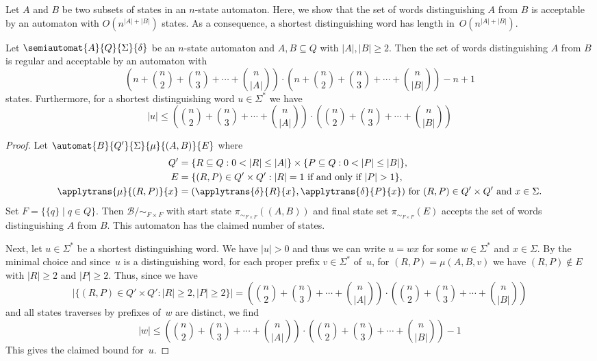
Let $A$ and $B$ be two subsets of states in an $n$-state automaton.
Here, we show that the set of words distinguishing $A$ from $B$
is acceptable by an automaton with $O(n^{|A|+|B|})$ states.
As a consequence, a shortest distinguishing word has length in~$O(n^{|A|+|B|})$.

\begin{theorem}
	\label{sync_max:thm:distinguishing_word_bound}
	Let $\semiautomat{A}{Q}{\Sigma}{\delta}$ 
	be an $n$-state automaton and $A, B \subseteq Q$
	with $|A|, |B| \ge 2$.	
	Then the set of words distinguishing $A$ from $B$ is regular
	and acceptable by an automaton with 
	\[
	\left( n + \binom{n}{2} + \binom{n}{3} + \cdots + \binom{n}{|A|} \right) \cdot
	\left( n + \binom{n}{2} + \binom{n}{3} + \cdots + \binom{n}{|B|} \right) - n + 1
	\]
	states.	Furthermore, for a shortest distinguishing word $u \in \Sigma^*$ we have
	\[
	|u| \le \left( \binom{n}{2} + \binom{n}{3} + \cdots + \binom{n}{|A|} \right) \cdot
	\left( \binom{n}{2} + \binom{n}{3} + \cdots + \binom{n}{|B|} \right)
	\]
\end{theorem}
\begin{proof}
	Let  $\automat{B}{Q'}{\Sigma}{\mu}{(A,B)}{E}$ where
	\begin{align*}
		Q' & = \{ R \subseteq Q : 0 < |R| \le |A| \} \times \{ P \subseteq Q : 0 < |P| \le |B| \}, \\
		E & = \{ (R, P) \in Q' \times Q' : |R| = 1 \text{ if and only if } |P| > 1 \}, \\
		\applytrans{\mu}{(R, P)}{x} & = (\applytrans{\delta}{R}{x}, \applytrans{\delta}{P}{x}) \text{ for } (R, P) \in Q' \times Q' \text{ and } x \in \Sigma.
	\end{align*}
    Set $F =  \{ \{q\} \mid q \in Q \}$.
    Then $\mathcal B / {\sim_{F \times F}}$ with start state $\pi_{\sim_{F \times F}}((A,B))$
    and final state set $\pi_{\sim_{F\times F}}(E)$
    accepts the set of words distinguishing $A$ from $B$.
    This automaton has the claimed number of states.
        
    Next, let $u \in \Sigma^*$ be a shortest distinguishing word.
    We have $|u| > 0$ and thus we can write $u = wx$ for some $w \in \Sigma^*$ and $x \in \Sigma$.
    By the minimal choice and since~$u$ is a distinguishing word, 
    for each proper prefix $v \in \Sigma^*$
    of~$u$, for $(R, P) = \mu(A, B, v)$
    we have $(R, P) \notin E$
    with $|R| \ge 2$ and $|P| \ge 2$.    
    Thus, since we have 
    \[
    |\{ (R, P) \in Q' \times Q' : |R| \ge 2, |P| \ge 2 \}| = \left( \binom{n}{2} + \binom{n}{3} + \cdots + \binom{n}{|A|} \right) \cdot 
    \left( \binom{n}{2} + \binom{n}{3} + \cdots + \binom{n}{|B|} \right)
    \]
    and all states traverses by prefixes of~$w$ are distinct,
    we find
    \[
    |w| \le \left( \binom{n}{2} + \binom{n}{3} + \cdots + \binom{n}{|A|} \right) \cdot 
    \left( \binom{n}{2} + \binom{n}{3} + \cdots + \binom{n}{|B|} \right) - 1
    \]
    This gives the claimed bound for~$u$.
\end{proof}